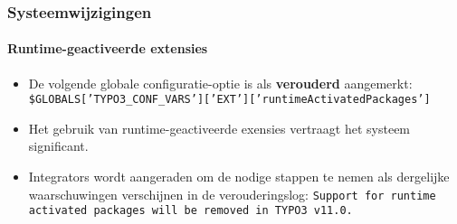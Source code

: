 
\begin{frame}[fragile]
	\frametitle{Systeemwijzigingen}
	\framesubtitle{Runtime-geactiveerde extensies}

	\begin{itemize}
		\item De volgende globale configuratie-optie is als \textbf{verouderd} aangemerkt:\newline
			\smaller
				\texttt{\$GLOBALS['TYPO3\_CONF\_VARS']['EXT']['runtimeActivatedPackages']}
			\normalsize
		\item Het gebruik van runtime-geactiveerde exensies vertraagt het systeem significant.
		\item Integrators wordt aangeraden om de nodige stappen te nemen als dergelijke waarschuwingen
			verschijnen in de verouderingslog:\newline
			\begingroup
				\fontsize{8}{10}
				\texttt{Support for runtime activated packages will be removed in TYPO3 v11.0.}
			\endgroup

	\end{itemize}

\end{frame}



